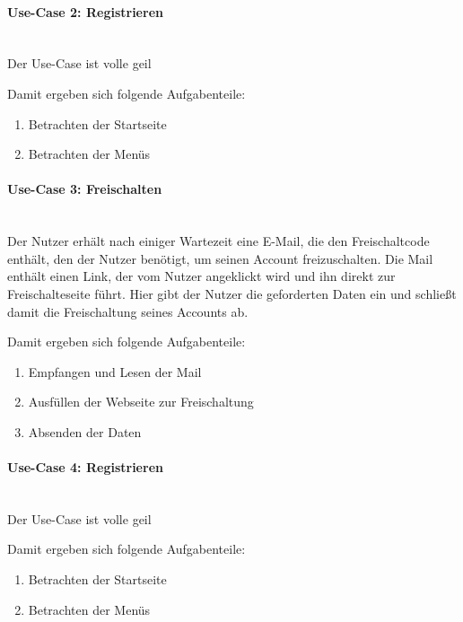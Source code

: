 \paragraph{Use-Case 2: Registrieren}\quad\\
Der Use-Case ist volle geil

Damit ergeben sich folgende Aufgabenteile:
\begin{enumerate}

		\item Betrachten der Startseite
		\item Betrachten der Menüs
\end{enumerate}

\paragraph{Use-Case 3: Freischalten}\quad\\
Der Nutzer erhält nach einiger Wartezeit eine E\hbox{-}Mail, die den Freischaltcode enthält, den der Nutzer benötigt, um seinen Account freizuschalten. Die Mail enthält einen Link, der vom Nutzer angeklickt wird und ihn direkt zur Freischalteseite führt. Hier gibt der Nutzer die geforderten Daten ein und schließt damit die Freischaltung seines Accounts ab.

Damit ergeben sich folgende Aufgabenteile:
\begin{enumerate}
		\item Empfangen und Lesen der Mail
		\item Ausfüllen der Webseite zur Freischaltung
		\item Absenden der Daten
\end{enumerate}


\paragraph{Use-Case 4: Registrieren}\quad\\
Der Use-Case ist volle geil

Damit ergeben sich folgende Aufgabenteile:
\begin{enumerate}

		\item Betrachten der Startseite
		\item Betrachten der Menüs
\end{enumerate}


